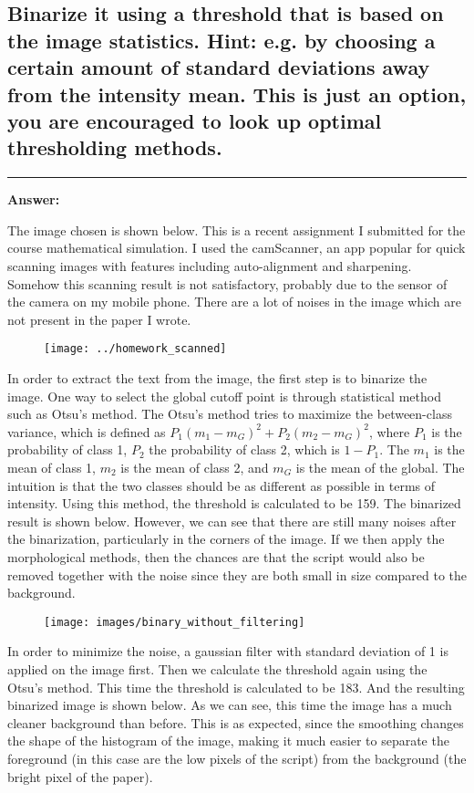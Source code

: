 \documentclass[conference]{styles/acmsiggraph}
\newenvironment{answer}{}{}
\begin{document}
\subsection{Binarize it using a threshold that is based on the image statistics. Hint: e.g. by choosing a certain
amount of standard deviations away from the intensity mean. This is just an option, you are
encouraged to look up optimal thresholding methods.}
\begin{answer}
	\rule{\textwidth}{0.4pt}
	
	\textbf{Answer:}

	The image chosen is shown below. This is a recent assignment I submitted for the course mathematical simulation. I used the camScanner, an app popular for quick scanning images with features including  auto-alignment and sharpening. Somehow this scanning result is not satisfactory, probably due to the sensor of the camera on my mobile phone. There are a lot of noises in the image which are not present in the paper I wrote. 

	\begin{figure}[H]
		\centering
		\texttt{[image: ../homework\_scanned]}
		\end{figure}	

In order to extract the text from the image, the  first step is to binarize the image. One way to select the global cutoff point is through statistical method such as Otsu's method. The Otsu's method tries to maximize the between-class variance, which is defined as $P_1 (m_1 - m_G )^2 + P_2 (m_2 - m_G )^2$, where $P_1$ is the probability of class 1, $P_2$ the probability of class 2, which is $1-P_1$. The $m_1$ is the mean of class 1, $m_2$ is the mean of class 2, and $m_G$ is the mean of the global. The intuition is that the two classes should be as different as possible in terms of intensity. Using this method, the threshold is calculated to be 159. 
The binarized result is shown below. However, we can see that there are still many noises after the binarization, particularly in the corners of the image. If we then apply the morphological methods, then the chances are that the script would also be removed together with the noise since they are both small in size compared to the background.

\begin{figure}[H]
	\centering
	\texttt{[image: images/binary\_without\_filtering]}
	\end{figure}	
	
	In order to minimize the noise, a gaussian filter with standard deviation of 1 is applied on the image first. Then we calculate the threshold again using the Otsu's method. This time the threshold is calculated to be 183. And the resulting binarized image is shown below. As we can see, this time the image has a much cleaner background than before. This is as expected, since the smoothing changes the shape of the histogram of the image, making it much easier to separate the foreground (in this case are the low pixels of the script) from the background (the bright pixel of the paper).
	

\end{answer}
\end{document}
